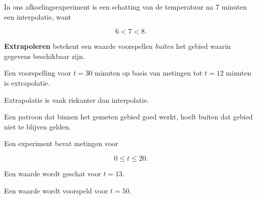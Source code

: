 \documentclass{ximera}
\begin{document}
In ons afkoelingsexperiment is een schatting van de temperatuur na
$7$ minuten een interpolatie, want

\[
6<7<8.
\]

\begin{definitie}[Extrapoleren]

\textbf{Extrapoleren} betekent een waarde voorspellen
\emph{buiten} het gebied waarin gegevens beschikbaar zijn.

\end{definitie}

Een voorspelling voor $t=30$ minuten op basis van metingen tot
$t=12$ minuten is extrapolatie.

\begin{opmerking}
Extrapolatie is vaak riskanter dan interpolatie.

Een patroon dat binnen het gemeten gebied goed werkt, hoeft buiten dat
gebied niet te blijven gelden.
\end{opmerking}


\begin{oefening}{\oefB \ESS}

Een experiment bevat metingen voor

\[
0\leq t\leq 20.
\]

\begin{question}
Een waarde wordt geschat voor $t=13$.

\begin{multipleChoice}
\end{multipleChoice}
\end{question}

\begin{question}
Een waarde wordt voorspeld voor $t=50$.

\begin{multipleChoice}
\end{multipleChoice}
\end{question}

\end{oefening}
\end{document}
